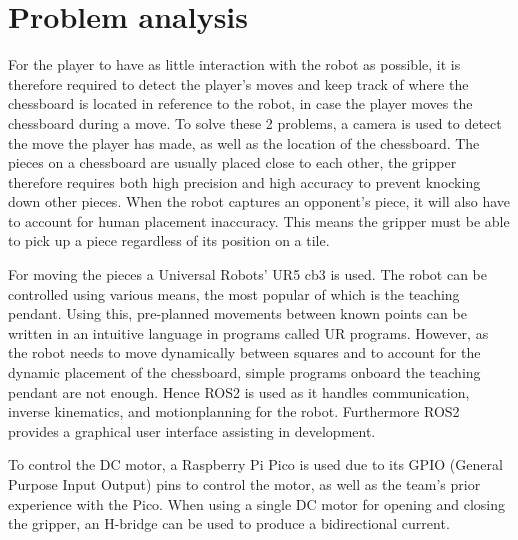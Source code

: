 \section{Problem analysis}

For the player to have as little interaction with the robot as possible, it is therefore required to detect the player's moves and keep track of where the chessboard is located in reference to the robot, in case the player moves the chessboard during a move. To solve these 2 problems, a camera is used to detect the move the player has made, as well as the location of the chessboard. The pieces on a chessboard are usually placed close to each other, the gripper therefore requires both high precision and high accuracy to prevent knocking down other pieces. When the robot captures an opponent's piece, it will also have to account for human placement inaccuracy. This means the gripper must be able to pick up a piece regardless of its position on a tile.

For moving the pieces a Universal Robots' UR5 cb3 is used.\cite{UR5} The robot can be controlled using various means, the most popular of which is the teaching pendant. Using this, pre-planned movements between known points can be written in an intuitive language in programs called UR programs. However, as the robot needs to move dynamically between squares and to account for the dynamic placement of the chessboard, simple programs onboard the teaching pendant are not enough. Hence ROS2 is used as it handles communication, inverse kinematics, and motionplanning for the robot. Furthermore ROS2 provides a graphical user interface assisting in development.

To control the DC motor, a Raspberry Pi Pico \cite{Rasperry-Pi-Pico} is used due to its GPIO (General Purpose Input Output) pins to control the motor, as well as the team's prior experience with the Pico. When using a single DC motor for opening and closing the gripper, an H-bridge can be used to produce a bidirectional current.

